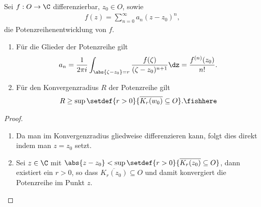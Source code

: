 \begin{cor}
\label{prop:2.31}
Sei $f: O\to \C$ differenzierbar, $z_0\in O$, sowie
\begin{align*}
f(z) = \sum\limits_{n=0}^\infty a_n(z-z_0)^n,
\end{align*} 
die Potenzreihenentwicklung von $f$.
\begin{enumerate}
  \item Für die Glieder der Potenzreihe gilt
  \begin{align*}
  a_n = \frac{1}{2\pi i} \int_{\abs{\zeta-z_0}=r}
\frac{f(\zeta)}{(\zeta-z_0)^{n+1}}\dz = \frac{f^{(n)}(z_0)}{n!}.
  \end{align*}
  \item Für den Konvergenzradius $R$ der Potenzreihe gilt
  \begin{align*}
  R\ge \sup\setdef{r > 0}{\overline{K_r(w_0)}\subseteq O}.\fishhere
  \end{align*}
\end{enumerate}
\begin{proof}
\begin{enumerate}
  \item Da man im Konvergenzradius gliedweise differenzieren kann, folgt
  dies direkt indem man $z = z_0$ setzt.
  \item Sei $z\in\C$ mit $\abs{z-z_0} < \sup\setdef{r >
  0}{\overline{K_r(z_0)}\subseteq O}$, dann existiert ein $r>0$, so dass
  $\overline{K_r(z_0)}\subseteq O$ und damit konvergiert die Potenzreihe im
  Punkt $z$.\qedhere
\end{enumerate}
\end{proof}
\end{cor}

